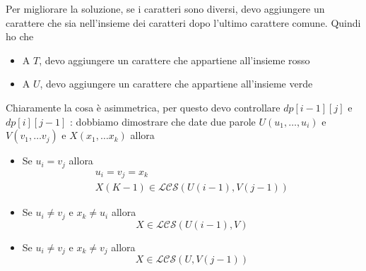 Per migliorare la soluzione, se i caratteri sono diversi, devo aggiungere un carattere che sia nell'insieme dei caratteri dopo l'ultimo carattere comune. Quindi ho che
\begin{itemize}
	\item A $ T $, devo aggiungere un carattere che appartiene all'insieme rosso
	\item A $ U $, devo aggiungere un carattere che appartiene all'insieme verde
\end{itemize}
Chiaramente la cosa è asimmetrica, per questo devo controllare $ dp\left[i-1\right]\left[j\right] $ e $ dp\left[i\right]\left[j-1\right] $
\vskip3mm
: dobbiamo dimostrare che date due parole $ U \left(u_1,\ldots ,u_i\right) $ e $ V\left(v_1 , \ldots v_j\right) $ e $ X \left(x_1 , \ldots x_k\right) $ allora
\begin{itemize}
	\item Se $ u_i = v_j $  allora
	      \begin{gather*}
		      u_i = v_j = x_k \\
		      X\left(K-1\right) \in \mathcal{LCS}\left(U\left(i-1\right), V\left(j-1\right)\right)
	      \end{gather*}
	\item Se $ u_i \neq v_j $ e $ x_k \neq  u_i $ allora
	      \[
		      X \in \mathcal{LCS}\left(U\left(i-1\right), V \right)
	      \]
	\item Se $ u_i \neq v_j $ e $ x_k \neq  v_j $ allora
	      \[
		      X \in \mathcal{LCS}\left(U, V\left(j-1\right) \right)
	      \]
\end{itemize}

